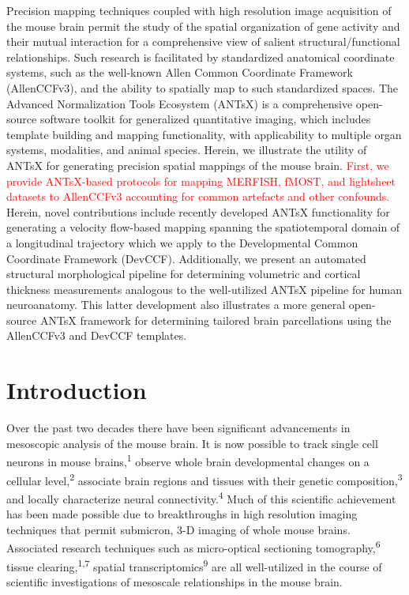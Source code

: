 \documentclass[
  12pt,
]{article}
\begin{document}
Precision mapping techniques coupled with high resolution image
acquisition of the mouse brain permit the study of the spatial
organization of gene activity and their mutual interaction for a
comprehensive view of salient structural/functional relationships. Such
research is facilitated by standardized anatomical coordinate systems,
such as the well-known Allen Common Coordinate Framework (AllenCCFv3),
and the ability to spatially map to such standardized spaces. The
Advanced Normalization Tools Ecosystem (ANTsX) is a comprehensive
open-source software toolkit for generalized quantitative imaging, which
includes template building and mapping functionality, with applicability
to multiple organ systems, modalities, and animal species. Herein, we
illustrate the utility of ANTsX for generating precision spatial
mappings of the mouse brain.
\textcolor{red}{First, we provide ANTsX-based protocols for mapping
MERFISH, fMOST, and lightsheet datasets to AllenCCFv3 accounting for common
artefacts and other confounds.} Herein, novel contributions include
recently developed ANTsX functionality for generating a velocity
flow-based mapping spanning the spatiotemporal domain of a longitudinal
trajectory which we apply to the Developmental Common Coordinate
Framework (DevCCF). Additionally, we present an automated structural
morphological pipeline for determining volumetric and cortical thickness
measurements analogous to the well-utilized ANTsX pipeline for human
neuroanatomy. This latter development also illustrates a more general
open-source ANTsX framework for determining tailored brain parcellations
using the AllenCCFv3 and DevCCF templates.

\clearpage

\hypertarget{introduction}{%
\section{Introduction}\label{introduction}}

Over the past two decades there have been significant advancements in
mesoscopic analysis of the mouse brain. It is now possible to track
single cell neurons in mouse brains,\textsuperscript{1} observe whole
brain developmental changes on a cellular level,\textsuperscript{2}
associate brain regions and tissues with their genetic
composition,\textsuperscript{3} and locally characterize neural
connectivity.\textsuperscript{4} Much of this scientific achievement has
been made possible due to breakthroughs in high resolution imaging
techniques that permit submicron, 3-D imaging of whole mouse brains.
Associated research techniques such as micro-optical sectioning
tomography,\textsuperscript{6} tissue clearing,\textsuperscript{1,7}
spatial transcriptomics\textsuperscript{9} are all well-utilized in the
course of scientific investigations of mesoscale relationships in the
mouse brain.
\end{document}
